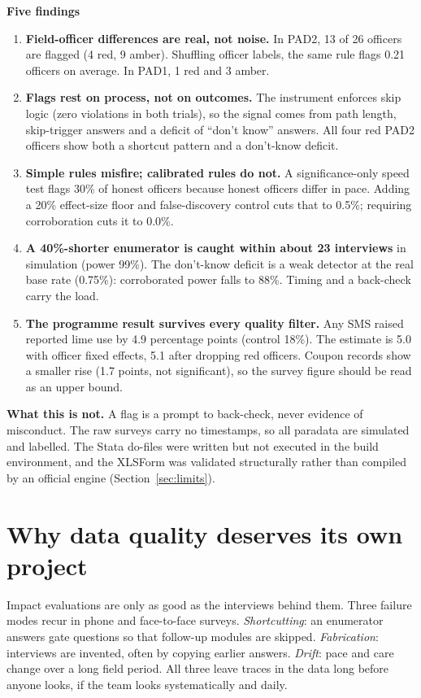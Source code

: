 \documentclass[11pt,a4paper]{article}
\begin{document}
\begin{callout}
\textbf{Five findings}
\begin{enumerate}
\item \textbf{Field-officer differences are real, not noise.} In PAD2, 13 of 26 officers are flagged (4 red, 9 amber). Shuffling officer labels, the same rule flags 0.21 officers on average. In PAD1, 1 red and 3 amber.
\item \textbf{Flags rest on process, not on outcomes.} The instrument enforces skip logic (zero violations in both trials), so the signal comes from path length, skip-trigger answers and a deficit of ``don't know'' answers. All four red PAD2 officers show both a shortcut pattern and a don't-know deficit.
\item \textbf{Simple rules misfire; calibrated rules do not.} A significance-only speed test flags 30\% of honest officers because honest officers differ in pace. Adding a 20\% effect-size floor and false-discovery control cuts that to 0.5\%; requiring corroboration cuts it to 0.0\%.
\item \textbf{A 40\%-shorter enumerator is caught within about 23 interviews} in simulation (power 99\%). The don't-know deficit is a weak detector at the real base rate (0.75\%): corroborated power falls to 88\%. Timing and a back-check carry the load.
\item \textbf{The programme result survives every quality filter.} Any SMS raised reported lime use by 4.9 percentage points (control 18\%). The estimate is 5.0 with officer fixed effects, 5.1 after dropping red officers. Coupon records show a smaller rise (1.7 points, not significant), so the survey figure should be read as an upper bound.
\end{enumerate}
\end{callout}

\textbf{What this is not.} A flag is a prompt to back-check, never evidence of misconduct. The raw surveys carry no timestamps, so all paradata are simulated and labelled. The Stata do-files were written but not executed in the build environment, and the XLSForm was validated structurally rather than compiled by an official engine (Section~\ref{sec:limits}).

\section{Why data quality deserves its own project}
Impact evaluations are only as good as the interviews behind them. Three failure modes recur in phone and face-to-face surveys. \emph{Shortcutting}: an enumerator answers gate questions so that follow-up modules are skipped. \emph{Fabrication}: interviews are invented, often by copying earlier answers. \emph{Drift}: pace and care change over a long field period. All three leave traces in the data long before anyone looks, if the team looks systematically and daily.
\end{document}

